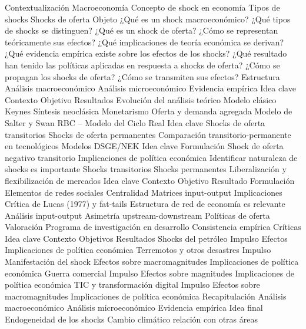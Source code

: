 \documentclass{nuevotema}
\begin{document}
\begin{esquema}[enumerate]
	\1[] 
		\2 Contextualización
			\3 Macroeconomía
			\3 Concepto de shock en economía
			\3 Tipos de shocks
			\3 Shocks de oferta
		\2 Objeto
			\3 ¿Qué es un shock macroeconómico?
			\3 ¿Qué tipos de shocks se distinguen?
			\3 ¿Qué es un shock de oferta?
			\3 ¿Cómo se representan teóricamente sus efectos?
			\3 ¿Qué implicaciones de teoría económica se derivan?
			\3 ¿Qué evidencia empírica existe sobre los efectos de los shocks?
			\3 ¿Qué resultado han tenido las políticas aplicadas en respuesta a shocks de oferta?
			\3 ¿Cómo se propagan los shocks de oferta?
			\3 ¿Cómo se transmiten sus efectos?
		\2 Estructura
			\3 Análisis macroeconómico
			\3 Análisis microeconómico
			\3 Evidencia empírica
	\1 
		\2 Idea clave
			\3 Contexto
			\3 Objetivo
			\3 Resultados
		\2 Evolución del análisis teórico
			\3 Modelo clásico
			\3 Keynes
			\3 Síntesis neoclásica
			\3 Monetarismo
			\3 Oferta y demanda agregada
			\3 Modelo de Salter y Swan
		\2 RBC -- Modelo del Ciclo Real
			\3 Idea clave
			\3 Shocks de oferta transitorios
			\3 Shocks de oferta permanentes
			\3 Comparación transitorio-permanente en tecnológicos
		\2 Modelos DSGE/NEK
			\3 Idea clave
			\3 Formulación
			\3 Shock de oferta negativo transitorio
		\2 Implicaciones de política económica
			\3 Identificar naturaleza de shocks es importante
			\3 Shocks transitorios
			\3 Shocks permanentes
			\3 Liberalización y flexibilización de mercados
	\1 
		\2 Idea clave
			\3 Contexto
			\3 Objetivo
			\3 Resultado
		\2 Formulación
			\3 Elementos de redes sociales
			\3 Centralidad
			\3 Matrices input-output
		\2 Implicaciones
			\3 Crítica de Lucas (1977) y fat-tails
			\3 Estructura de red de economía es relevante
			\3 Análisis input-output
			\3 Asimetría upstream-downstream
			\3 Políticas de oferta
		\2 Valoración
			\3 Programa de investigación en desarrollo
			\3 Consistencia empírica
			\3 Críticas
	\1 
		\2 Idea clave
			\3 Contexto
			\3 Objetivos
			\3 Resultados
		\2 Shocks del petróleo
			\3 Impulso
			\3 Efectos
			\3 Implicaciones de política económica
		\2 Terremotos y otros desastres
			\3 Impulso
			\3 Manifestación del shock
			\3 Efectos sobre macromagnitudes
			\3 Implicaciones de política económica
		\2 Guerra comercial
			\3 Impulso
			\3 Efectos sobre magnitudes
			\3 Implicaciones de política económica
		\2 TIC y transformación digital
			\3 Impulso
			\3 Efectos sobre macromagnitudes
			\3 Implicaciones de política económica
	\1[] 
		\2 Recapitulación
			\3 Análisis macroeconómico
			\3 Análisis microeconómico
			\3 Evidencia empírica
		\2 Idea final
			\3 Endogeneidad de los shocks
			\3 Cambio climático
			\3 relación con otras áreas

\end{esquema}
\end{document}
